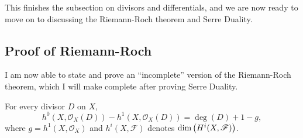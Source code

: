 This finishes the subsection on divisors and differentials, and we 
are now ready to move on to discussing the Riemann-Roch theorem 
and Serre Duality.

\subsection{Proof of Riemann-Roch}\label{ss:riemann_roch_proof}
I am now able to state and prove an ``incomplete'' version of the
Riemann-Roch theorem, which I will make complete after proving Serre
Duality.

\begin{thm}
  \label{thm:riemann_roch_cohomology}
  For every divisor $D$ on $X$,
  \[
    h^{0}(X, \mathscr{O}_X(D))-h^{1}(X, \mathscr{O}_X(D))=\deg(D)+1-g,
  \]
  where $g=h^{1}(X, \mathscr{O}_{X})$ and $h^i(X,\mathscr{F})$
  denotes $\textnormal{dim}\left(H^i(X,\mathscr{F})\right)$.
\end{thm}
